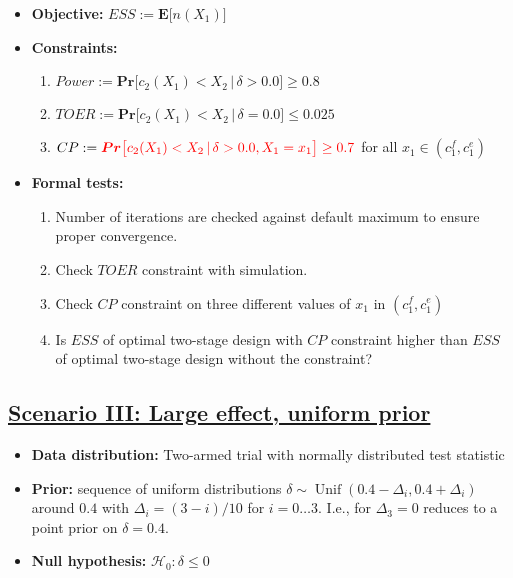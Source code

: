 \documentclass[]{book}
\providecommand{\tightlist}{%
  \setlength{\itemsep}{0pt}\setlength{\parskip}{0pt}}
\begin{document}
\begin{itemize}
\tightlist
\item
  \textbf{Objective:} \(ESS := \boldsymbol{E}\big[n(X_1)\big]\)
\item
  \textbf{Constraints:}

  \begin{enumerate}
  \def\labelenumi{\arabic{enumi}.}
  \tightlist
  \item
    \(Power := \boldsymbol{Pr}\big[c_2(X_1) < X_2\,|\,\delta>0.0\big] \geq 0.8\)
  \item
    \(TOER := \boldsymbol{Pr}\big[c_2(X_1) < X_2\,|\,\delta=0.0\big] \leq 0.025\)
  \item
    \(CP := \color{red}{\boldsymbol{Pr}\big[c_2(X_1) < X_2\,|\,\delta> 0.0, X_1 = x_1\big] \geq 0.7}\)
    for all \(x_1\in(c_1^f, c_1^e)\)
  \end{enumerate}
\item
  \textbf{Formal tests:}

  \begin{enumerate}
  \def\labelenumi{\arabic{enumi}.}
  \tightlist
  \item
    Number of iterations are checked against default maximum to ensure proper
    convergence.
  \item
    Check \(TOER\) constraint with simulation.
  \item
    Check \(CP\) constraint on three different values of \(x_1\) in
    \((c_1^f, c_1^e)\)
  \item
    Is \(ESS\) of optimal two-stage design with \(CP\) constraint higher than
    \(ESS\) of optimal two-stage design without the constraint?
  \end{enumerate}
\end{itemize}

\hypertarget{scenario-iii-large-effect-uniform-prior}{%
\subsection{\texorpdfstring{\protect\hyperlink{scenarioIII}{Scenario III: Large effect, uniform prior}}{Scenario III: Large effect, uniform prior}}\label{scenario-iii-large-effect-uniform-prior}}

\begin{itemize}
\tightlist
\item
  \textbf{Data distribution:} Two-armed trial with normally distributed test statistic
\item
  \textbf{Prior:} sequence of uniform distributions
  \(\delta\sim\operatorname{Unif}(0.4 - \Delta_i, 0.4 + \Delta_i)\)
  around \(0.4\) with \(\Delta_i=(3 - i)/10\) for \(i=0\ldots 3\).
  I.e., for \(\Delta_3=0\) reduces to a point prior on \(\delta=0.4\).
\item
  \textbf{Null hypothesis:} \(\mathcal{H}_0:\delta \leq 0\)
\end{itemize}
\end{document}
